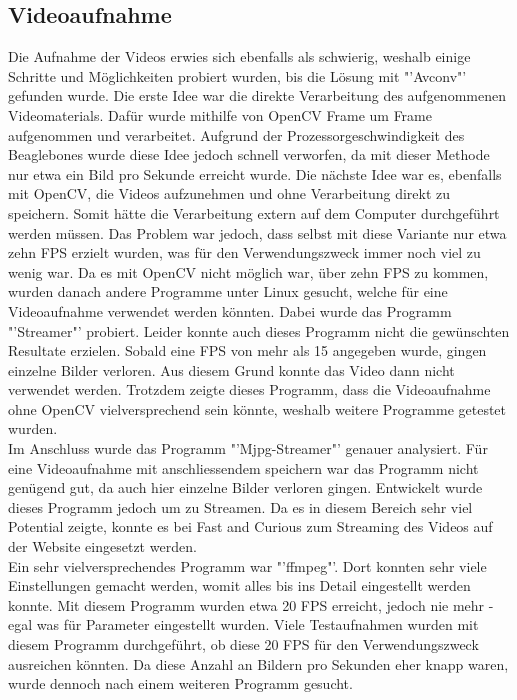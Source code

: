 \subsection{Videoaufnahme}
Die Aufnahme der Videos erwies sich ebenfalls als schwierig, weshalb einige Schritte und Möglichkeiten probiert wurden, bis die Lösung mit "'Avconv"' gefunden wurde. Die erste Idee war die direkte Verarbeitung des aufgenommenen Videomaterials. Dafür wurde mithilfe von OpenCV Frame um Frame aufgenommen und verarbeitet. Aufgrund der Prozessorgeschwindigkeit des Beaglebones wurde diese Idee jedoch schnell verworfen, da mit dieser Methode nur etwa ein Bild pro Sekunde erreicht wurde. Die nächste Idee war es, ebenfalls mit OpenCV, die Videos aufzunehmen und ohne Verarbeitung direkt zu speichern. Somit hätte die Verarbeitung extern auf dem Computer durchgeführt werden müssen. Das Problem war jedoch, dass selbst mit diese Variante nur etwa zehn FPS erzielt wurden, was für den Verwendungszweck immer noch viel zu wenig war. Da es mit OpenCV nicht möglich war, über zehn FPS zu kommen, wurden danach andere Programme unter Linux gesucht, welche für eine Videoaufnahme verwendet werden könnten. Dabei wurde das Programm "'Streamer"' probiert. Leider konnte auch dieses Programm nicht die gewünschten Resultate erzielen. Sobald eine FPS von mehr als 15 angegeben wurde, gingen einzelne Bilder verloren. Aus diesem Grund konnte das Video dann nicht verwendet werden. Trotzdem zeigte dieses Programm, dass die Videoaufnahme ohne OpenCV vielversprechend sein könnte, weshalb weitere Programme getestet wurden. \cite{Streamer}\\
Im Anschluss wurde das Programm "'Mjpg-Streamer"' genauer analysiert. Für eine Videoaufnahme mit anschliessendem speichern war das Programm nicht genügend gut, da auch hier einzelne Bilder verloren gingen. Entwickelt wurde dieses Programm jedoch um zu Streamen. Da es in diesem Bereich sehr viel Potential zeigte, konnte es bei Fast and Curious zum Streaming des Videos auf der Website eingesetzt werden. \cite{MjpgStreamer} \\
Ein sehr vielversprechendes Programm war "'ffmpeg"'. Dort konnten sehr viele Einstellungen gemacht werden, womit alles bis ins Detail eingestellt werden konnte. Mit diesem Programm wurden etwa 20 FPS erreicht, jedoch nie mehr - egal was für Parameter eingestellt wurden. Viele Testaufnahmen wurden mit diesem Programm durchgeführt, ob diese 20 FPS für den Verwendungszweck ausreichen könnten. Da diese Anzahl an Bildern pro Sekunden eher knapp waren, wurde dennoch nach einem weiteren Programm gesucht. \cite{Ffmpeg} \\
